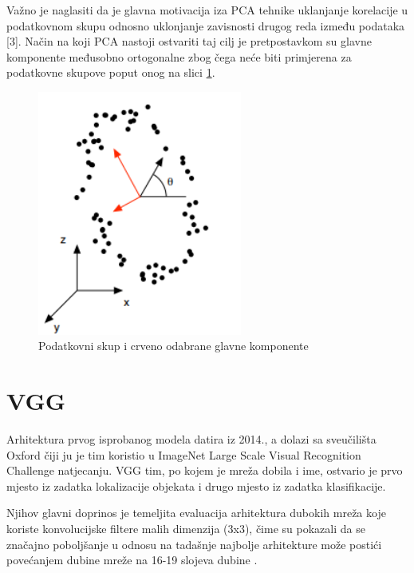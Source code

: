 \documentclass[times, utf8, proizvoljni, numeric]{fer}
\begin{document}
Važno je naglasiti da je glavna motivacija iza PCA tehnike uklanjanje korelacije u podatkovnom skupu odnosno uklonjanje zavisnosti drugog reda između podataka [3]. Način na koji PCA nastoji ostvariti taj cilj je pretpostavkom su glavne komponente međusobno ortogonalne zbog čega neće biti primjerena za podatkovne skupove poput onog na slici \ref{fg:pca_problem}.

\begin{figure}[!ht]
	\begin{center}
		\captionsetup{justification=centering}
		\includegraphics[width=0.6\textwidth]{./imgs/pca_problem.png}
		\caption{Podatkovni skup i crveno odabrane glavne komponente \cite{PCA}}
		\label{fg:pca_problem}
	\end{center}
\end{figure}


\section{VGG}

Arhitektura prvog isprobanog modela datira iz 2014., a dolazi sa sveučilišta Oxford čiji ju je tim koristio u ImageNet Large Scale Visual Recognition Challenge natjecanju. VGG tim, po kojem je mreža dobila i ime, ostvario je prvo mjesto iz zadatka lokalizacije objekata i drugo mjesto iz zadatka klasifikacije.

Njihov glavni doprinos je temeljita evaluacija arhitektura dubokih mreža koje koriste konvolucijske filtere malih dimenzija (3x3), čime su pokazali da se značajno poboljšanje u odnosu na tadašnje najbolje arhitekture može postići povećanjem dubine mreže na 16-19 slojeva dubine \cite{VGG}. 
\end{document}
